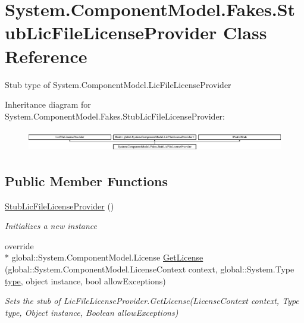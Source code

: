\hypertarget{class_system_1_1_component_model_1_1_fakes_1_1_stub_lic_file_license_provider}{\section{System.\-Component\-Model.\-Fakes.\-Stub\-Lic\-File\-License\-Provider Class Reference}
\label{class_system_1_1_component_model_1_1_fakes_1_1_stub_lic_file_license_provider}
}


Stub type of System.\-Component\-Model.\-Lic\-File\-License\-Provider 


Inheritance diagram for System.\-Component\-Model.\-Fakes.\-Stub\-Lic\-File\-License\-Provider\-:\begin{figure}[H]
\begin{center}
\leavevmode
\includegraphics[height=0.964686cm]{class_system_1_1_component_model_1_1_fakes_1_1_stub_lic_file_license_provider}
\end{center}
\end{figure}
\subsection*{Public Member Functions}
\begin{DoxyCompactItemize}
\item 
\hyperlink{class_system_1_1_component_model_1_1_fakes_1_1_stub_lic_file_license_provider_aadd8c975d615fd291af5ba91eb89e37a}{Stub\-Lic\-File\-License\-Provider} ()
\begin{DoxyCompactList}\small\item\em Initializes a new instance\end{DoxyCompactList}\item 
override \\*
global\-::\-System.\-Component\-Model.\-License \hyperlink{class_system_1_1_component_model_1_1_fakes_1_1_stub_lic_file_license_provider_a99f98315efe77815c0fe2acb55fb3e3a}{Get\-License} (global\-::\-System.\-Component\-Model.\-License\-Context context, global\-::\-System.\-Type \hyperlink{jquery-1_810_82-vsdoc_8js_a3940565e83a9bfd10d95ffd27536da91}{type}, object instance, bool allow\-Exceptions)
\begin{DoxyCompactList}\small\item\em Sets the stub of Lic\-File\-License\-Provider.\-Get\-License(\-License\-Context context, Type type, Object instance, Boolean allow\-Exceptions)\end{DoxyCompactList}\end{DoxyCompactItemize}
